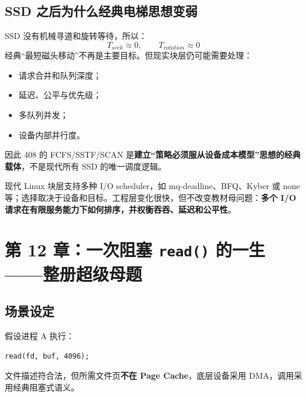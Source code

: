 \documentclass[11pt,a4paper]{ctexart}
\newcommand{\kw}[1]{\textbf{#1}}
\newcommand{\code}[1]{\texttt{#1}}
\begin{document}
\subsection{SSD 之后为什么经典电梯思想变弱}
SSD 没有机械寻道和旋转等待，所以：
\[
T_{seek}\approx 0,\qquad T_{rotation}\approx 0
\]
经典“最短磁头移动”不再是主要目标。但现实块层仍可能需要处理：
\begin{itemize}
  \item 请求合并和队列深度；
  \item 延迟、公平与优先级；
  \item 多队列并发；
  \item 设备内部并行度。
\end{itemize}
因此 408 的 FCFS/SSTF/SCAN 是\kw{建立“策略必须服从设备成本模型”思想的经典载体}，不是现代所有 SSD 的唯一调度逻辑。

\begin{eng}[现代 Linux 校准]
现代 Linux 块层支持多种 I/O scheduler，如 mq-deadline、BFQ、Kyber 或 none 等；选择取决于设备和目标。工程层变化很快，但不改变教材母问题：\kw{多个 I/O 请求在有限服务能力下如何排序，并权衡吞吞、延迟和公平性}。
\end{eng}

\section{第 12 章：一次阻塞 \code{read()} 的一生——整册超级母题}

\subsection{场景设定}
假设进程 A 执行：
\begin{lstlisting}
read(fd, buf, 4096);
\end{lstlisting}
文件描述符合法，但所需文件页\kw{不在 Page Cache}，底层设备采用 DMA，调用采用经典阻塞式语义。
\end{document}
